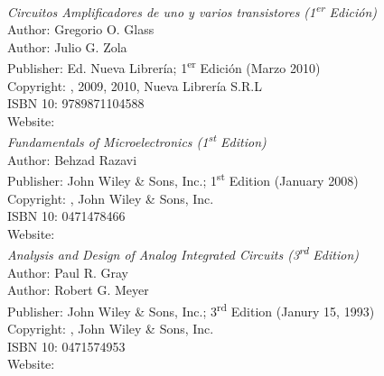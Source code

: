 
\begin{thebibliography}{9}




\emph{Circuitos Amplificadores de uno y varios transistores (1\textsuperscript{er} Edición) }\\
Author: Gregorio O. Glass\\
Author: Julio G. Zola\\
Publisher: Ed. Nueva Librería; 1\textsuperscript{er} Edición (Marzo 2010)\\
Copyright: \textcopyright {}, 2009, 2010, Nueva Librería S.R.L\\
ISBN 10: 9789871104588\\
Website: \\




\emph{Fundamentals of Microelectronics (1\textsuperscript{st} Edition) }\\
Author: Behzad Razavi\\
Publisher: John Wiley \& Sons, Inc.; 1\textsuperscript{st} Edition (January 2008)\\
Copyright: \textcopyright {}, John Wiley \& Sons, Inc.\\
ISBN 10: 0471478466\\
Website: \\




\emph{Analysis and Design of Analog Integrated Circuits (3\textsuperscript{rd} Edition)}\\
Author: Paul R. Gray\\
Author: Robert G. Meyer\\
Publisher: John Wiley \& Sons, Inc.; 3\textsuperscript{rd} Edition (Janury 15, 1993)\\
Copyright: \textcopyright {}, John Wiley \& Sons, Inc.\\
ISBN 10: 0471574953\\
Website: \\





\end{thebibliography}
